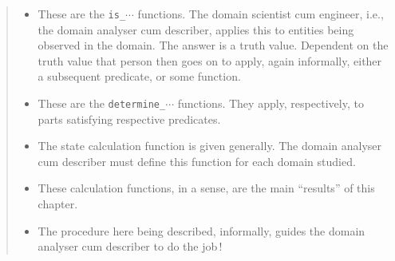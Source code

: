 \label{functions-table-1}
\begin{minipage}[h]{5.5cm}\sf\small\sf
\begin{quote}
\begin{itemize}
\item {} These are the \texttt{is\_$\cdots$}
  functions. The domain scientist cum engineer, i.e., the domain
  analyser cum describer, applies this to entities being observed in
  the domain. The answer is a truth value. Dependent on the truth value
  that person then goes on to apply, again informally, either a
  subsequent predicate, or some function.
\item {} These are the
  \texttt{determine\_$\cdots$} functions. They apply, respectively, to
  parts satisfying respective predicates.
\item {} The state calculation function is
  given generally. The domain analyser cum describer must define this
  function for each domain studied.
\item {} These calculation functions, in a
  sense, are the main ``results'' of this chapter.
\item {} The procedure here being described,
  informally, guides the domain analyser cum describer to do the job\,!
\end{itemize}\normalsize
\end{quote}
\end{minipage}
\begin{minipage}[h]{5mm} \ \
\end{minipage}
\begin{minipage}[h]{7cm}\small\sf
\qbtabular\\

\qetabular\normalsize
\end{minipage}
\endboiteepaisseavecuntitre
